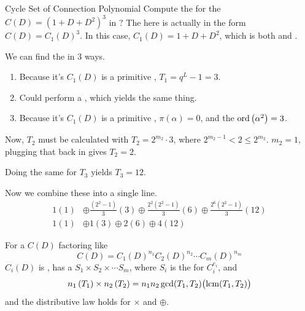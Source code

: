 \begin{example}{Cycle Set of Connection Polynomial}
  Compute the  for the  $C(D) = {\left( 1+D+D^{2} \right)}^{3}$ in ?
  \tcblower{}
  The  here is actually in the form $C(D) = {C_{1}(D)}^{3}$.
  In this case, $C_{1}(D) = 1+D+D^{2}$, which is both  and .

  We can find the  in 3 ways.
  \begin{enumerate}[noitemsep]
  \item Because it's $C_{1}(D)$ is a primitive , $T_{1}=q^{L}-1 = 3$.
  \item Could perform a , which yields the same thing.
  \item Because it's $C_{1}(D)$ is a primitive , $\pi(\alpha)=0$, and the $\operatorname{\operatorname{ord}} \left( \alpha^{2} \right) = 3$.
  \end{enumerate}

  Now, $T_{2}$ must be calculated with $T_{2} = 2^{m_{2}} \cdot 3$, where $2^{m_{2}-1} < 2 \leq 2^{m_{2}}$.
  $m_{2} = 1$, plugging that back in gives $T_{2} = 2$.

  Doing the same for $T_{3}$ yields $T_{3} = 12$.

  Now we combine these into a single line.
  \begin{align*}
    1(1) &\oplus \frac{ \left( 2^{2} - 1 \right)}{3} (3) \oplus \frac{ 2^{2} \left( 2^{2} - 1 \right)}{3} (6) \oplus \frac{2^{6} \left( 2^{2} - 1 \right)}{3} (12) \\
    1(1) &\oplus 1 (3) \oplus 2 (6) \oplus 4 (12)
  \end{align*}
\end{example}

\begin{theorem}\label{thm:Arbitrary_Connection_Polynomial}
  For a  $C(D)$ factoring like
  \begin{equation*}
    C(D) = {C_{1}(D)}^{n_{1}} {C_{2}(D)}^{n_{2}} \cdots {C_{m}(D)}^{n_{m}}
  \end{equation*}
  $C_{i}(D)$ is , has a  $S_{1} \times S_{2} \times \cdots S_{m}$, where $S_{i}$ is the  for $C_{i}^{e_{i}}$, and
  \begin{equation}\label{eq:Arbitrary_Connection_Polynomial}
    n_{1} \left( T_{1} \right) \times n_{2} \left( T_{2} \right) = n_{1}n_{2} \gcd(T_{1}, T_{2}) \bigl( \operatorname{\operatorname{lcm}}(T_{1}, T_{2}) \bigr)
  \end{equation}
  and the distributive law holds for $\times$ and $\oplus$.
\end{theorem}

